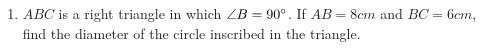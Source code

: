 \begin{enumerate}
\item $ABC$ is a right triangle in which $\angle B = 90\degree$. If $AB = 8 cm$ and $BC = 6 cm$, find the diameter of the circle inscribed in the triangle.

\end{enumerate}
